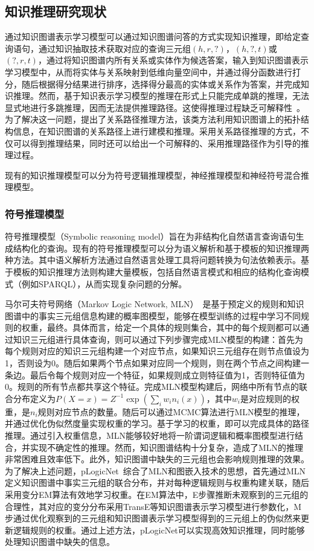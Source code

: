 \documentclass[algorithmlist, AutoFakeBold, AutoFakeSlant, figurelist, tablelist, nomlist, engineering]{seuthesix}
\begin{document}
\subsection{知识推理研究现状}
通过知识图谱表示学习模型可以通过知识图谱问答的方式实现知识推理，即给定查询语句，通过知识抽取技术获取对应的查询三元组$\left(h, r, ?\right)$，$\left(h, ?, t\right)$或$\left(?, r, t\right)$，通过将知识图谱内所有关系或实体作为候选答案，输入到知识图谱表示学习模型中，从而将实体与关系映射到低维向量空间中，并通过得分函数进行打分，随后根据得分结果进行排序，选择得分最高的实体或关系作为答案，并完成知识推理。然而，基于知识表示学习模型的推理在形式上只能完成单跳的推理，无法显式地进行多跳推理，因而无法提供推理路径。这使得推理过程缺乏可解释性~\cite{wang2019deeppath}。为了解决这一问题，提出了关系路径推理方法，该类方法利用知识图谱上的拓扑结构信息，在知识图谱的关系路径上进行建模和推理。采用关系路径推理的方式，不仅可以得到推理结果，同时还可以给出一个可解释的、采用推理路径作为引导的推理过程。

现有的知识推理模型可以分为符号逻辑推理模型，神经推理模型和神经符号混合推理模型。

\subsubsection{符号推理模型}
符号推理模型（Symbolic reasoning model）旨在为非结构化自然语言查询语句生成结构化的查询。现有的符号推理模型可以分为语义解析和基于模板的知识推理两种方法。其中语义解析方法通过自然语言处理工具将问题转换为句法依赖表示。基于模板的知识推理方法则构建大量模板，包括自然语言模式和相应的结构化查询模式（例如SPARQL），从而实现复杂问题的分解。

马尔可夫符号网络（Markov Logic Network, MLN）~\cite{richardson2006markov}是基于预定义的规则和知识图谱中的事实三元组信息构建的概率图模型，能够在模型训练的过程中学习不同规则的权重，最终。具体而言，给定一个具体的规则集合，其中的每个规则都可以通过知识三元组进行具体查询，则可以通过下列步骤完成MLN模型的构建：首先为每个规则对应的知识三元组构建一个对应节点，如果知识三元组存在则节点值设为1，否则设为0。随后如果两个节点如果对应同一个规则，则在两个节点之间构建一条边。最后令每个规则对应一个特征，如果规则成立则特征值为1，否则特征值为0。规则的所有节点都共享这个特征。完成MLN模型构建后，网络中所有节点的联合分布定义为$P(X=x)=Z^{-1} \exp \left(\sum_i w_i n_i(x)\right)$，其中$w_i$是对应规则的权重，是$n_i$规则对应节点的数量。随后可以通过MCMC算法进行MLN模型的推理，并通过优化伪似然度量实现权重的学习。基于学习的权重，即可以完成具体的路径推理。通过引入权重信息，MLN能够较好地将一阶谓词逻辑和概率图模型进行结合，并实现不确定性的推理。然而，知识图谱结构十分复杂，造成了MLN的推理非常困难且效率低下。此外，知识图谱中缺失的三元组也会影响规则推理的效果。为了解决上述问题，pLogicNet~\cite{qu2019probabilistic}综合了MLN和图嵌入技术的思想，首先通过MLN定义知识图谱中事实三元组的联合分布，并对每种逻辑规则与权重构建关联，随后采用变分EM算法有效地学习权重。在EM算法中，E步骤推断未观察到的三元组的合理性，其对应的变分分布采用TransE等知识图谱表示学习模型进行参数化，M步通过优化观察到的三元组和知识图谱表示学习模型得到的三元组上的伪似然来更新逻辑规则的权重。通过上述方法，pLogicNet可以实现高效知识推理，同时能够处理知识图谱中缺失的信息。
\end{document}
